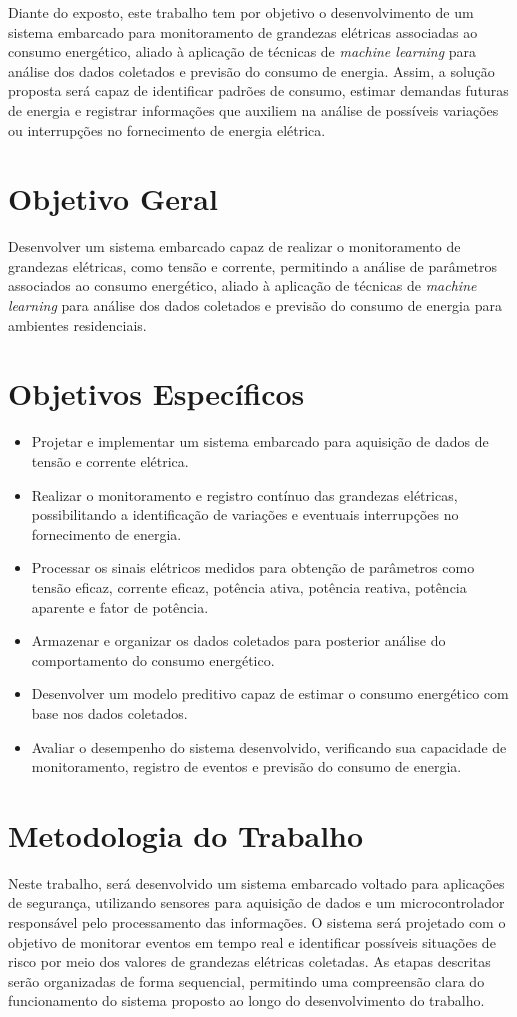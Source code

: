 Diante do exposto, este trabalho tem por objetivo o desenvolvimento de um sistema embarcado para monitoramento de grandezas elétricas associadas ao consumo energético, aliado à aplicação de técnicas de \textit{machine learning} para análise dos dados coletados e previsão do consumo de energia. Assim, a solução proposta será capaz de identificar padrões de consumo, estimar demandas futuras de energia e registrar informações que auxiliem na análise de possíveis variações ou interrupções no fornecimento de energia elétrica.

\section{Objetivo Geral}
Desenvolver um sistema embarcado capaz de realizar o monitoramento de grandezas elétricas, como tensão e corrente, permitindo a análise de parâmetros associados ao consumo energético, aliado à aplicação de técnicas de \textit{machine learning} para análise dos dados coletados e previsão do consumo de energia para ambientes residenciais.

\section{Objetivos Específicos}
\begin{itemize}
    \item Projetar e implementar um sistema embarcado para aquisição de dados de tensão e corrente elétrica.
    \item Realizar o monitoramento e registro contínuo das grandezas elétricas, possibilitando a identificação de variações e eventuais interrupções no fornecimento de energia.
    \item Processar os sinais elétricos medidos para obtenção de parâmetros como tensão eficaz, corrente eficaz, potência ativa, potência reativa, potência aparente e fator de potência.
    \item Armazenar e organizar os dados coletados para posterior análise do comportamento do consumo energético.
    \item Desenvolver um modelo preditivo capaz de estimar o consumo energético com base nos dados coletados.
    \item Avaliar o desempenho do sistema desenvolvido, verificando sua capacidade de monitoramento, registro de eventos e previsão do consumo de energia.
\end{itemize}

\section{Metodologia do Trabalho}
Neste trabalho, será desenvolvido um sistema embarcado voltado para aplicações de segurança, utilizando sensores para aquisição de dados e um microcontrolador responsável pelo processamento das informações. O sistema será projetado com o objetivo de monitorar eventos em tempo real e identificar possíveis situações de risco por meio dos valores de grandezas elétricas coletadas. As etapas descritas serão organizadas de forma sequencial, permitindo uma compreensão clara do funcionamento do sistema proposto ao longo do desenvolvimento do trabalho.

